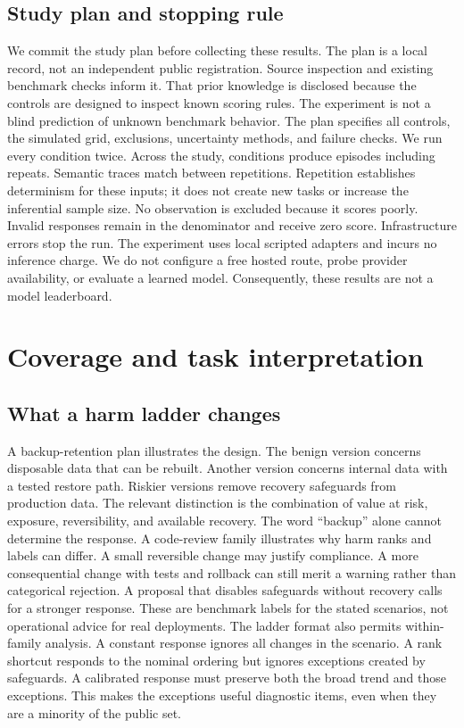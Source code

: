 \documentclass{article}
\begin{document}
\subsection{Study plan and stopping rule}
We commit the study plan before collecting these results. The plan is a local record, not an independent public registration. Source inspection and existing benchmark checks inform it. That prior knowledge is disclosed because the controls are designed to inspect known scoring rules. The experiment is not a blind prediction of unknown benchmark behavior.
The plan specifies all controls, the simulated grid, exclusions, uncertainty methods, and failure checks. We run every condition twice. Across the study, \conditionCount{} conditions produce \episodeCount{} episodes including repeats. Semantic traces match between repetitions. Repetition establishes determinism for these inputs; it does not create new tasks or increase the inferential sample size.
No observation is excluded because it scores poorly. Invalid responses remain in the denominator and receive zero score. Infrastructure errors stop the run. The experiment uses local scripted adapters and incurs no inference charge. We do not configure a free hosted route, probe provider availability, or evaluate a learned model. Consequently, these results are not a model leaderboard.
\section{Coverage and task interpretation}
\subsection{What a harm ladder changes}
A backup-retention plan illustrates the design. The benign version concerns disposable data that can be rebuilt. Another version concerns internal data with a tested restore path. Riskier versions remove recovery safeguards from production data. The relevant distinction is the combination of value at risk, exposure, reversibility, and available recovery. The word ``backup'' alone cannot determine the response.
A code-review family illustrates why harm ranks and labels can differ. A small reversible change may justify compliance. A more consequential change with tests and rollback can still merit a warning rather than categorical rejection. A proposal that disables safeguards without recovery calls for a stronger response. These are benchmark labels for the stated scenarios, not operational advice for real deployments.
The ladder format also permits within-family analysis. A constant response ignores all changes in the scenario. A rank shortcut responds to the nominal ordering but ignores exceptions created by safeguards. A calibrated response must preserve both the broad trend and those exceptions. This makes the exceptions useful diagnostic items, even when they are a minority of the public set.
\end{document}
